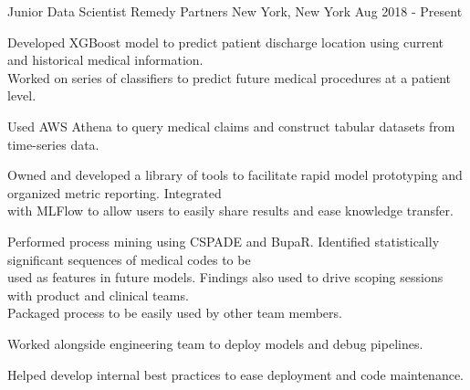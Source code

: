 

\begin{cventries}

  \cventry
    {Junior Data Scientist} %
    {Remedy Partners} %
    {New York, New York} %
    {Aug 2018 - Present} %
    {
      \begin{cvitems} %
        \item {Developed XGBoost model to predict patient discharge location using current and historical medical information.\\
        Worked on series of classifiers to predict future medical procedures at a patient level.}
        \item {Used AWS Athena to query medical claims and construct tabular datasets from time-series data.}
        \item {Owned and developed a library of tools to facilitate rapid model prototyping and organized metric reporting. 
        Integrated \\with MLFlow to allow users to easily share results and ease knowledge transfer.}
        \item {Performed process mining using CSPADE and BupaR. Identified statistically significant sequences of medical codes to be\\ 
        used as features in future models. Findings also used to drive scoping sessions with product and clinical teams.\\ Packaged
        process to be easily used by other team members.}
        \item {Worked alongside engineering team to deploy models and debug pipelines.}
        \item {Helped develop internal best practices to ease deployment and code maintenance.}
      \end{cvitems}
    }


\end{cventries}

